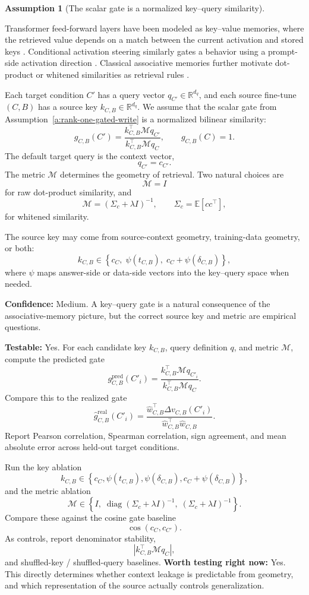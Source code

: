 \documentclass[11pt]{article}
\theoremstyle{definition}
\theoremstyle{definition}
\theoremstyle{assumptionstyle}
\newtheorem{assumption}{Assumption}[section]
\begin{document}
\begin{assumption}[The scalar gate is a normalized key--query similarity]
\label{a:bilinear-gate}


Transformer feed-forward layers have been modeled as key--value memories, where
the retrieved value depends on a match between the current activation and stored
keys \cite{geva2021}. Conditional activation steering similarly gates a behavior
using a prompt-side activation direction \cite{lee2025}. Classical associative
memories further motivate dot-product or whitened similarities as retrieval rules
\cite{kohonen1972,anderson1972}.

Each target condition \(C'\) has a query vector
\(q_{C'}\in\mathbb R^{d_q}\), and each source fine-tune \((C,B)\) has a
source key \(k_{C,B}\in\mathbb R^{d_q}\). We assume that the scalar gate from
Assumption~\ref{a:rank-one-gated-write} is a normalized bilinear similarity:
\[
g_{C,B}(C')
=
\frac{
k_{C,B}^{\top}\mathcal M q_{C'}
}{
k_{C,B}^{\top}\mathcal M q_{C}
},
\qquad
g_{C,B}(C)=1.
\]
The default target query is the context vector,
\[
q_{C'}=c_{C'}.
\]
The metric \(\mathcal M\) determines the geometry of retrieval. Two natural
choices are
\[
\mathcal M=I
\]
for raw dot-product similarity, and
\[
\mathcal M=(\Sigma_c+\lambda I)^{-1},
\qquad
\Sigma_c=\mathbb E[cc^\top],
\]
for whitened similarity.

The source key may come from source-context geometry, training-data geometry, or
both:
\[
k_{C,B}
\in
\left\{
c_{C},
\;
\psi(t_{C,B}),
\;
c_{C}+\psi(\delta_{C,B})
\right\},
\]
where \(\psi\) maps answer-side or data-side vectors into the key--query space
when needed.

\textbf{Confidence:} Medium. A key--query gate is a natural consequence
of the associative-memory picture, but the correct source key and metric are
empirical questions.

\textbf{Testable:} Yes. For each candidate key \(k_{C,B}\), query
definition \(q\), and metric \(\mathcal M\), compute the predicted gate
\[
g^{\mathrm{pred}}_{C,B}(C'_i)
=
\frac{
k_{C,B}^{\top}\mathcal M q_{C'_i}
}{
k_{C,B}^{\top}\mathcal M q_{C}
}.
\]
Compare this to the realized gate
\[
\widehat g^{\mathrm{real}}_{C,B}(C'_i)
=
\frac{
\widehat w_{C,B}^{\top}
\Delta v_{C,B}(C'_i)
}{
\widehat w_{C,B}^{\top}
\widehat w_{C,B}
}.
\]
Report Pearson correlation, Spearman correlation, sign agreement, and mean
absolute error across held-out target conditions.

Run the key ablation
\[
k_{C,B}
\in
\left\{
c_{C},
\psi(t_{C,B}),
\psi(\delta_{C,B}),
c_{C}+\psi(\delta_{C,B})
\right\},
\]
and the metric ablation
\[
\mathcal M
\in
\left\{
I,\;
\operatorname{diag}(\Sigma_c+\lambda I)^{-1},\;
(\Sigma_c+\lambda I)^{-1}
\right\}.
\]
Compare these against the cosine gate baseline
\[
\cos(c_{C},c_{C'}).
\]
As controls, report denominator stability,
\[
\left|
k_{C,B}^{\top}\mathcal M q_{C}
\right|,
\]
and shuffled-key / shuffled-query baselines.
\textbf{Worth testing right now:} Yes. This directly determines whether
context leakage is predictable from geometry, and which representation of the
source actually controls generalization.
\end{assumption}
\end{document}
